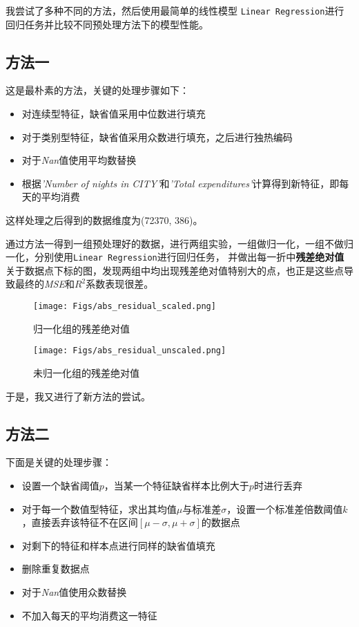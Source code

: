 \documentclass[12pt, a4paper, oneside]{ctexart}
\begin{document}
我尝试了多种不同的方法，然后使用最简单的线性模型
\texttt{Linear Regression}进行回归任务并比较不同预处理方法下的模型性能。

\subsection{方法一}
这是最朴素的方法，关键的处理步骤如下：
\begin{itemize}
    \item 对连续型特征，缺省值采用中位数进行填充
    \item 对于类别型特征，缺省值采用众数进行填充，之后进行独热编码
    \item 对于\emph{Nan}值使用平均数替换
    \item 根据\emph{'Number of nights in CITY'}和\emph{'Total expenditures'}计算得到新特征，即每天的平均消费
\end{itemize}

这样处理之后得到的数据维度为(72370, 386)。

通过方法一得到一组预处理好的数据，进行两组实验，一组做归一化，一组不做归一化，分别使用\texttt{Linear Regression}进行回归任务，
并做出每一折中\textbf{残差绝对值}关于数据点下标的图，发现两组中均出现残差绝对值特别大的点，也正是这些点导致最终的\emph{MSE}和\emph{$R^2$}系数表现很差。
\begin{figure}[H]
    \centering
    \texttt{[image: Figs/abs\_residual\_scaled.png]}
    \caption{归一化组的残差绝对值}
    \label{fig: abs_residual_scaled}
\end{figure}

\begin{figure}[H]
    \centering
    \texttt{[image: Figs/abs\_residual\_unscaled.png]}
    \caption{未归一化组的残差绝对值}
\end{figure}
于是，我又进行了新方法的尝试。

\subsection{方法二}
下面是关键的处理步骤：
\begin{itemize}
    \item 设置一个缺省阈值$p$，当某一个特征缺省样本比例大于$p$时进行丢弃
    \item 对于每一个数值型特征，求出其均值$\mu$与标准差$\sigma$，设置一个标准差倍数阈值$k$，直接丢弃该特征不在区间$\left[\mu - \sigma, \mu + \sigma\right]$的数据点
    \item 对剩下的特征和样本点进行同样的缺省值填充
    \item 删除重复数据点
    \item 对于\emph{Nan}值使用众数替换
    \item 不加入每天的平均消费这一特征
\end{itemize}
\end{document}
